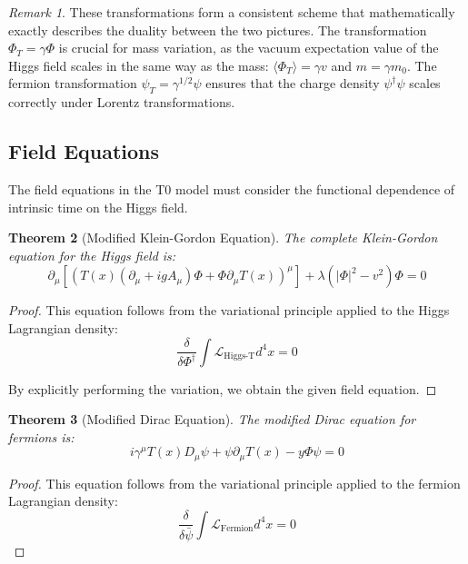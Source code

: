 \documentclass{article}
\newtheorem{theorem}{Theorem}[section]
\theoremstyle{definition}
\theoremstyle{remark}
\newtheorem{remark}[theorem]{Remark}
\newcommand{\Tfield}{T(x)} %
\newcommand{\DcovT}[1]{\Tfield D_\mu #1 + #1 \partial_\mu \Tfield}
\newcommand{\DhiggsTdef}{\Tfield (\partial_\mu + igA_\mu)\Phi + \Phi \partial_\mu \Tfield}
\begin{document}
	\begin{remark}
		These transformations form a consistent scheme that mathematically exactly describes the duality between the two pictures. The transformation $\Phi_T = \gamma \Phi$ is crucial for mass variation, as the vacuum expectation value of the Higgs field scales in the same way as the mass: $\langle \Phi_T \rangle = \gamma v$ and $m = \gamma m_0$. The fermion transformation $\psi_T = \gamma^{1/2} \psi$ ensures that the charge density $\psi^\dagger\psi$ scales correctly under Lorentz transformations.
	\end{remark}
	
	\subsection{Field Equations}
	
	The field equations in the T0 model must consider the functional dependence of intrinsic time on the Higgs field. 
	
	\begin{theorem}[Modified Klein-Gordon Equation]
		The complete Klein-Gordon equation for the Higgs field is:
		\begin{equation}
			\partial_\mu[(\DhiggsTdef)^\mu] + \lambda(|\Phi|^2 - v^2)\Phi = 0
		\end{equation}
	\end{theorem}
	
	\begin{proof}
		This equation follows from the variational principle applied to the Higgs Lagrangian density:
		\begin{equation}
			\frac{\delta}{\delta \Phi^\dagger}\int \mathcal{L}_{\text{Higgs-T}} d^4x = 0
		\end{equation}
		
		By explicitly performing the variation, we obtain the given field equation.
	\end{proof}
	
	\begin{theorem}[Modified Dirac Equation]
		The modified Dirac equation for fermions is:
		\begin{equation}
			i\gamma^\mu \DcovT{\psi} - y\Phi\psi = 0
		\end{equation}
	\end{theorem}
	
	\begin{proof}
		This equation follows from the variational principle applied to the fermion Lagrangian density:
		\begin{equation}
			\frac{\delta}{\delta \bar{\psi}}\int \mathcal{L}_{\text{Fermion}} d^4x = 0
		\end{equation}
	\end{proof}
	
\end{document}
